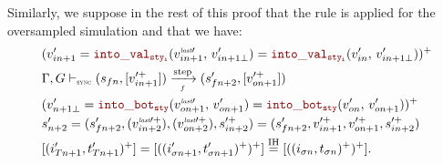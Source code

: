\begin{skippableproof}
\begin{itemize}
              Similarly, we suppose in the rest of this proof that the rule
               is applied for the oversampled
              simulation and that we have:
              \begin{align*}
                   & (v'_{in+1} = \intoVal{sty_i}{v_{in+1}^{\explast\prime}}{v'_{in+1\bot}} = \intoVal{sty_i}{v'_{in}}{v'_{in+1\bot}})^+                                                              \\
                   & \compOpsem{s_{fn}}{v_{in+1}^{\prime+}}{f}{s'_{fn+2}}{v_{on+1}^{\prime+}}                                                                                                         \\
                   & (v'_{n+1\bot} = \intoBot{sty}{v_{on+1}^{\explast\prime}}{v'_{on+1}} = \intoBot{sty}{v'_{on}}{v'_{on+1}})^+                                                                       \\
                   & s'_{n+2} = (s'_{fn+2}, (v_{in+2}^{\explast\prime+}), (v_{on+2}^{\explast\prime+}), s_{in+2}^{\prime+}) = (s'_{fn+2}, v_{in+1}^{\prime+}, v_{on+1}^{\prime+}, s_{in+2}^{\prime+}) \\
                   & [(i'_{Tn+1}, t'_{Tn+1})^+] = [((i'_{\sigma n+1}, t'_{\sigma n+1})^+)^+] \myeq{IH} [((i_{\sigma n}, t_{\sigma n})^+)^+].
              \end{align*}


\end{itemize}
\end{skippableproof}
